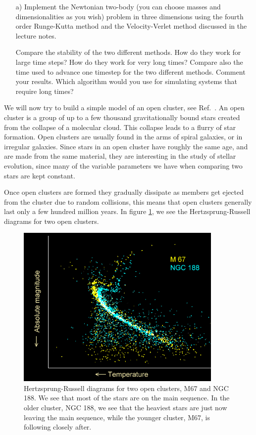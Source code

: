 \documentclass[11pt,a4wide]{article}
\begin{document}
\begin{enumerate}
\item[a)] Implement the Newtonian two-body (you can choose masses and dimensionalities as
  you wish) problem in three dimensions using the fourth order
  Runge-Kutta method and the Velocity-Verlet method discussed in
  the lecture notes.

 Compare the
stability of the two different methods. How do they work for large
time steps? How do they work for very long times? Compare also the
time used to advance one timestep for the two different
methods. Comment your results. Which algorithm would you use for
simulating systems that require long  times?

\end{enumerate}





We will now try to build a simple model of an open
cluster, see Ref.~\cite{openclusterref}. An
open cluster is a group of up to a few thousand gravitationally bound
stars created from the collapse of a molecular cloud. This collapse
leads to a flurry of star formation. Open clusters are usually found
in the arms of spiral galaxies, or in irregular galaxies. Since stars
in an open cluster have roughly the same age, and are made from the
same material, they are interesting in the study of stellar evolution,
since many of the variable parameters we have when comparing two stars
are kept constant.

Once open clusters are formed they gradually dissipate as members get
ejected from the cluster due to random collisions, this means that
open clusters generally last only a few hundred million years. In
figure \ref{HR}, we see the Hertzsprung-Russell diagrams for two open
clusters.

\begin{figure}[!h]
\centering
\includegraphics[width=10cm]{FigAstro/open_cluster_hr_diagram_ages.png}
\caption{Hertzsprung-Russell diagrams for two open clusters, M67 and
  NGC 188. We see that most of the stars are on the main sequence. In
  the older cluster, NGC 188, we see that the heaviest stars are just
  now leaving the main sequence, while the younger cluster, M67, is
  following closely after.}
\label{HR}
\end{figure}
\end{document}
